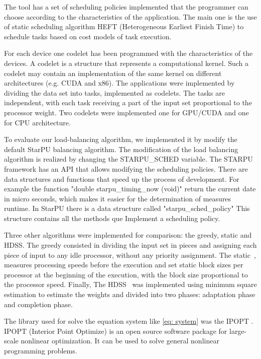 \documentclass[journal]{IEEEtran}
\begin{document}
The tool has a set of scheduling policies implemented that the programmer can
choose according to the characteristics of the application. The main one is the
use of static scheduling algorithm HEFT (Heterogeneous Earliest Finish Time) to
schedule tasks based on cost models of task execution.

For each device one codelet has been programmed with the characteristics of the
devices. A codelet is a structure that represents a computational kernel. Such a
codelet may contain an implementation of the same kernel on different
architectures (e.g. CUDA and x86).  The applications were implemented by
dividing the data set into tasks, implemented as codelets. The tasks are
independent, with each task receiving a part of the input set proportional to
the processor weight. Two codelets were implemented one for GPU/CUDA and one for
CPU architecture.

To evaluate our load-balancing algorithm, we implemented it by modify the default StarPU balancing algorithm. The modification of the load balancing algorithm is realized by changing the STARPU\_SCHED variable. The STARPU framework has an API that allows modifying the scheduling policies. There are data structures and functions that speed up the process of development. For example the function "double starpu\_timing\_now (void)"  return the current date in micro seconds, which makes it easier for the determination of measures runtime. In StarPU there is a data structure called "starpu\_sched\_policy" This structure contains all the methods que Implement a scheduling policy. 

Three other algorithms were implemented for comparison: the greedy, static and
HDSS. The greedy consisted in dividing the input set in pieces and assigning
each piece of input to any idle processor, without any priority assignment. The
static~\cite{raphael}, measures processing speeds before the execution and set
static block sizes per processor at the beginning of the execution, with the
block size proportional to the processor speed. Finally, The HDSS~\cite{HDSS}
was implemented using minimum square estimation to estimate the weights and
divided into two phases: adaptation phase and completion phase.

The library used for solve the equation system like \ref{eq: system} was the IPOPT \cite{point}. IPOPT (Interior Point Optimize) is an open source software package for large-scale nonlinear optimization. It can be used to solve general nonlinear programming problems.
\end{document}
